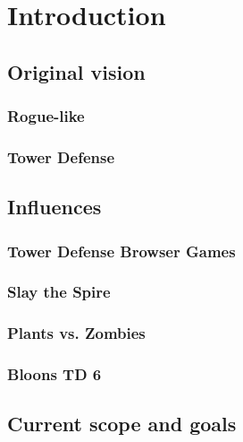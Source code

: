 \chapter{Introduction}

\section{Original vision}

\subsection{Rogue-like}

\subsection{Tower Defense}

\section{Influences}

\subsection{Tower Defense Browser Games}

\subsection{Slay the Spire}

\subsection{Plants vs. Zombies}

\subsection{Bloons TD 6}

\section{Current scope and goals}
